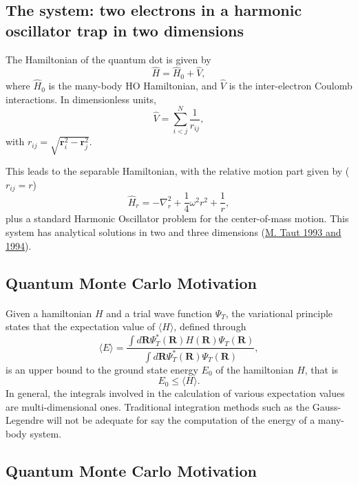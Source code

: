 \documentclass[%
oneside,                 %
final,                   %
10pt]{article}
\begin{document}
\vspace{6mm}





\subsection{The system: two electrons in a harmonic oscillator trap in two dimensions}

The Hamiltonian of the quantum dot is given by
\[ \hat{H} = \hat{H}_0 + \hat{V}, 
\]
where $\hat{H}_0$ is the many-body HO Hamiltonian, and $\hat{V}$ is the
inter-electron Coulomb interactions. In dimensionless units,
\[ \hat{V}= \sum_{i<j}^N \frac{1}{r_{ij}},
\]
with $r_{ij}=\sqrt{\mathbf{r}_i^2 - \mathbf{r}_j^2}$.

This leads to the  separable Hamiltonian, with the relative motion part given by ($r_{ij}=r$)
\[ 
\hat{H}_r=-\nabla^2_r + \frac{1}{4}\omega^2r^2+ \frac{1}{r},
\]
plus a standard Harmonic Oscillator problem  for the center-of-mass motion.
This system has analytical solutions in two and three dimensions (\href{{https://journals.aps.org/pra/abstract/10.1103/PhysRevA.48.3561}}{M. Taut 1993 and 1994}). 

\subsection{Quantum Monte Carlo Motivation}

\paragraph{}
Given a hamiltonian $H$ and a trial wave function $\Psi_T$, the variational principle states that the expectation value of $\langle H \rangle$, defined through 
\[
   \langle E \rangle =
   \frac{\int d\bm{R}\Psi^{\ast}_T(\bm{R})H(\bm{R})\Psi_T(\bm{R})}
        {\int d\bm{R}\Psi^{\ast}_T(\bm{R})\Psi_T(\bm{R})},
\]
is an upper bound to the ground state energy $E_0$ of the hamiltonian $H$, that is 
\[
    E_0 \le \langle H \rangle .
\]
In general, the integrals involved in the calculation of various  expectation values  are multi-dimensional ones. Traditional integration methods such as the Gauss-Legendre will not be adequate for say the  computation of the energy of a many-body system.




\subsection{Quantum Monte Carlo Motivation}
\end{document}
